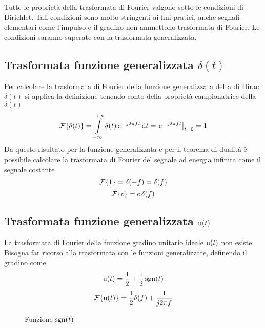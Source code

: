 \begin{nota}Tutte le proprietà della trasformata di Fourier valgono sotto le condizioni di Dirichlet. Tali condizioni sono molto stringenti ai fini pratici, anche segnali elementari come l'impulso e il gradino non ammettono trasformata di Fourier. Le condizioni saranno superate con la trasformata generalizzata.\end{nota}

\subsection{Trasformata funzione generalizzata $\delta(t)$}
Per calcolare la trasformata di Fourier della funzione generalizzata delta di Dirac $\delta(t)$ si applica la definizione tenendo conto della proprietà campionatrice della $\delta(t)$
\begin{equation}
\operatorname{\mathcal{F}}\!\left\lbrace{\delta(t)}\right\rbrace=\int\limits_{-\infty}^{+\infty}{\delta(t)\operatorname{e}^{-\operatorname{\mathit{j}\!} 2\pi f t}}{\,\mathop{}\!\mathrm{d}{t}}=\left.{\operatorname{e}^{-\operatorname{\mathit{j}\!} 2\pi f t}}\right\rvert_{t=0}=1
\end{equation}
Da questo risultato per la funzione generalizzata e per il teorema di dualità è possibile calcolare la trasformata di Fourier del segnale ad energia infinita come il segnale costante
\begin{equation}
\operatorname{\mathcal{F}}\!\left\lbrace{1}\right\rbrace=\delta(-f)=\delta(f)
\end{equation}
\[\operatorname{\mathcal{F}}\!\left\lbrace{c}\right\rbrace=c\,\delta(f)\]

\subsection{Trasformata funzione generalizzata $\operatorname{u}(t)$}
La trasformata di Fourier della funzione gradino unitario ideale $\operatorname{u}(t)$ non esiste. Bisogna far ricorso alla trasformata con le funzioni generalizzate, definendo il gradino come
\[\operatorname{u}(t)=\frac{1}{2}+\frac{1}{2}\operatorname{sgn}(t)\]
\begin{equation}
\operatorname{\mathcal{F}}\!\left\lbrace{\operatorname{u}(t)}\right\rbrace=\frac{1}{2}\delta(f)+\frac{1}{\operatorname{\mathit{j}\!} 2\pi f}
\end{equation}
\begin{figure}[h!]\centering
{}
\caption{Funzione $\operatorname{sgn}(t)$}
\end{figure}

